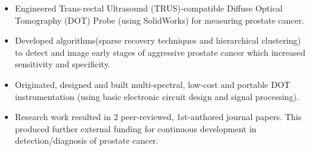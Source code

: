 \documentclass{my_cv}
\begin{document}
\begin{flushleft}
\begin{itemize}
\item Engineered Trans-rectal Ultrasound (TRUS)-compatible Diffuse Optical Tomography (DOT) Probe (using SolidWorks) for measuring prostate cancer. 

\item Developed algorithms(sparse recovery techniques and hierarchical clustering) to detect and image early stages of aggressive prostate cancer which increased sensitivity and specificity.

\item Originated, designed and built multi-spectral, low-cost and portable DOT instrumentation (using basic electronic circuit design and signal processing).

\item Research work resulted in 2 peer-reviewed, 1st-authored journal papers. This produced further external funding for continuous development in detection/diagnosis of prostate cancer.

\end{itemize}
\end{flushleft}


\vspace{-7mm}%
\end{document}
